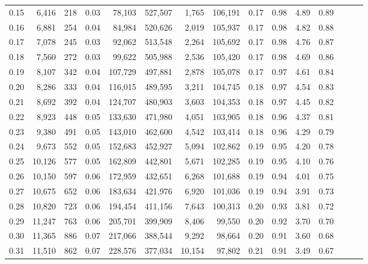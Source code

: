 \begin{tabular}{rrrrrrrrrrrrrrr}
0.15 &   6,416 &    218 &  0.03 &   78,103 &  527,507 &    1,765 &  106,191 &  0.17 &  0.98 &  4.89 &      0.89 \\
0.16 &   6,881 &    254 &  0.04 &   84,984 &  520,626 &    2,019 &  105,937 &  0.17 &  0.98 &  4.82 &      0.88 \\
0.17 &   7,078 &    245 &  0.03 &   92,062 &  513,548 &    2,264 &  105,692 &  0.17 &  0.98 &  4.76 &      0.87 \\
0.18 &   7,560 &    272 &  0.03 &   99,622 &  505,988 &    2,536 &  105,420 &  0.17 &  0.98 &  4.69 &      0.86 \\
0.19 &   8,107 &    342 &  0.04 &  107,729 &  497,881 &    2,878 &  105,078 &  0.17 &  0.97 &  4.61 &      0.84 \\
0.20 &   8,286 &    333 &  0.04 &  116,015 &  489,595 &    3,211 &  104,745 &  0.18 &  0.97 &  4.54 &      0.83 \\
0.21 &   8,692 &    392 &  0.04 &  124,707 &  480,903 &    3,603 &  104,353 &  0.18 &  0.97 &  4.45 &      0.82 \\
0.22 &   8,923 &    448 &  0.05 &  133,630 &  471,980 &    4,051 &  103,905 &  0.18 &  0.96 &  4.37 &      0.81 \\
0.23 &   9,380 &    491 &  0.05 &  143,010 &  462,600 &    4,542 &  103,414 &  0.18 &  0.96 &  4.29 &      0.79 \\
0.24 &   9,673 &    552 &  0.05 &  152,683 &  452,927 &    5,094 &  102,862 &  0.19 &  0.95 &  4.20 &      0.78 \\
0.25 &  10,126 &    577 &  0.05 &  162,809 &  442,801 &    5,671 &  102,285 &  0.19 &  0.95 &  4.10 &      0.76 \\
0.26 &  10,150 &    597 &  0.06 &  172,959 &  432,651 &    6,268 &  101,688 &  0.19 &  0.94 &  4.01 &      0.75 \\
0.27 &  10,675 &    652 &  0.06 &  183,634 &  421,976 &    6,920 &  101,036 &  0.19 &  0.94 &  3.91 &      0.73 \\
0.28 &  10,820 &    723 &  0.06 &  194,454 &  411,156 &    7,643 &  100,313 &  0.20 &  0.93 &  3.81 &      0.72 \\
0.29 &  11,247 &    763 &  0.06 &  205,701 &  399,909 &    8,406 &   99,550 &  0.20 &  0.92 &  3.70 &      0.70 \\
0.30 &  11,365 &    886 &  0.07 &  217,066 &  388,544 &    9,292 &   98,664 &  0.20 &  0.91 &  3.60 &      0.68 \\
0.31 &  11,510 &    862 &  0.07 &  228,576 &  377,034 &   10,154 &   97,802 &  0.21 &  0.91 &  3.49 &      0.67 \\

\end{tabular}
